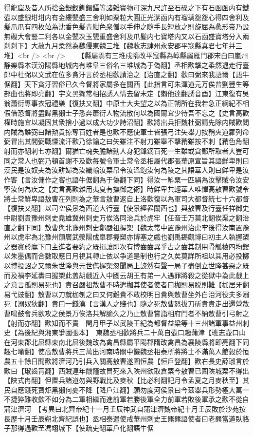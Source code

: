 得龍窟及昔人所捨金銀釵釧鐶鑷等諸雜寶物可深九尺許至石磉之下有石函函内有鐵壺以盛銀坩坩内有金縷甖盛三舍利如粟粒大圓正光潔函内有瑠璃盌盌心得四舍利及髪爪爪有四枚竝為沈香色髪青紺色衆僧以手伸之隨手長短放之則旋屈為蠡形帝乃設無礙大會豎二利各以金甖次玉甖重盛舍利及爪髪内七寶塔内又以石函盛寶塔分入兩刹刹下】大赦九月柔然為魏侵東魏三堆【魏收志肆州永安郡平寇縣真君七年并三堆】<br />
<br />
　　【縣屬焉有三堆戍隋改平寇縣為崞縣屬雁門郡宋白曰嵐州静樂縣本漢汾陽縣地城内有堆阜三俗名三堆城為于偽翻】丞相歡擊之柔然退走行臺郎中杜弼以文武在位多貪汙言於丞相歡請治之【治直之翻】歡曰弼來我語爾【語牛倨翻】天下貪汙習俗已久今督將家屬多在關西【此指言可朱渾道元万俟普劉豐生等部曲也將即亮翻】宇文黑獺常相招誘人情去留未定【獺他達翻誘音酉】江東復有吳翁蕭衍專事衣冠禮樂【復扶又翻】中原士大夫望之以為正朔所在我若急正綱紀不相假借恐督將盡歸黑獺士子悉奔蕭衍人物流散何以為國爾宜少待吾不忘之【史言高歡權時施宜以凝固其衆捨小過以成大功少詩沼翻】歡將出兵拒魏杜弼請先除内賊歡問内賊為誰弼曰諸勲貴掠奪百姓者是也歡不應使軍士皆張弓注矢舉刀按矟夾道羅列命弼冒出其間弼戰慄流汗歡乃徐諭之曰矢雖注不射刀雖舉不擊矟雖按不刺【矟色角翻射而亦翻刺七亦翻】爾猶亡魂失膽諸勳人身犯鋒鏑百死一生雖或貪鄙所取者大豈可同之常人也弼乃頓首謝不及歡每號令軍士常令丞相屬代郡張華原宣旨其語鮮卑則曰漢民是汝奴夫為汝耕婦為汝織輸汝粟帛令汝溫飽汝何為陵之其語華人則曰鮮卑是汝作客【言汝傭作之客也語牛倨翻為于偽翻下同】得汝一斛粟一匹絹為汝擊賊令汝安寧汝何為疾之【史言高歡雜用夷夏有撫御之術】時鮮卑共輕華人唯憚高敖曹歡號令將士常鮮卑語敖曹在列則為之華言敖曹返自上洛歡復以為軍司大都督統七十六都督【復扶又翻】以司空侯景為西道大行臺【使景經畧關西也】與敖曹及行臺任祥御史中尉劉貴豫州刺史堯雄冀州刺史万俟洛同治兵於虎牢【任音壬万莫北翻俟渠之翻治直之翻下同】敖曹與北豫州刺史鄭嚴祖握槊【魏太常中置豫州治虎牢後得汝南置豫州以虎牢為北豫州領廣武滎陽成臯郡握槊亦博塞之戲也劉禹錫觀博曰初主人執握槊之器寘於廡下曰主進者要約之既揖讓即次有博齒齒異乎古之齒其制用骨觚稜四均鏤以朱墨偶而合數取應日月視其轉止依以争道是制也行之久矣莫詳所祖以其用必投擲以博投詔之又爾朱世隆與元世儁握槊忽聞局上詨然有聲一局子盡倒立世隆甚惡之既而及禍李延夀曰握槊此盖胡戲近入中國云胡王有弟一人遇罪將殺之從獄中為此戲上之意言孤則易死也】貴召嚴祖敖曹不時遣枷其使者使者曰枷則易脱則難【枷居牙翻易弋豉翻】敖曹以刀就枷刎之曰又何難貴不敢校明日貴與敖曹坐外白治河役夫多溺死【溺奴狄翻】貴曰一錢漢【言漢人之賤也】隨之死敖曹怒拔刀斫貴貴走出還營敖曹鳴鼓會兵欲攻之侯景万俟洛共解諭久之乃止敖曹嘗詣相府門者不納敖曹引弓射之【射而亦翻】歡知而不責　閏月甲子以武陵王紀為都督益梁等十三州諸軍事益州刺史【為後紀與湘東爭國張本】　東魏丞相歡將兵二十萬自壺口趣蒲津【班志壺口山在河東郡北屈縣東南北屈後魏改為禽昌縣屬平陽郡隋改禽昌為襄陵縣將即亮翻下同趣七喻翻】使高敖曹將兵三萬出河南時關中饑魏丞相泰所將將士不滿萬人館穀於恒農五十餘日聞歡將濟河乃引兵入關高敖曹遂圍恒農【恒戶登翻】歡右長史薛琡言於歡曰【琡齒肓翻】西賊連年饑饉故冒死來入陜州欲取倉粟今敖曹已圍陜城粟不得出【陜式冉翻】但置兵諸道勿與野戰比及麥秋【比必利翻記月令孟夏之月麥秋至】其民自應餓死寶炬黑獺何憂不降【降戶江翻】願勿度河侯景曰今茲舉兵形勢極大萬一不捷猝難收歛不如分為二軍相繼而進前軍若勝後軍全力前軍若敗後軍承之歡不從自蒲津濟河　【考異曰北齊帝紀十一月壬辰神武自蒲津濟魏帝紀十月壬辰敗於沙苑按長歷十月壬辰朔北齊紀誤也】丞相泰遣使戒華州刺史王羆羆語使者曰老羆當道臥貉子那得過歡至馮翊城下【使疏吏翻華戶化翻語牛倨